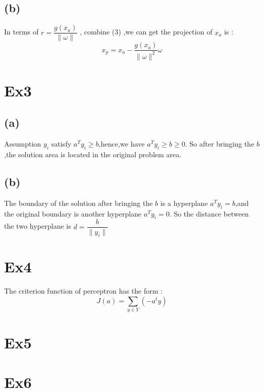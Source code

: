 \documentclass[10pt,a4paper]{article}
\begin{document}
	\subsection{(b)}
	In terms of $r=\dfrac{g(x_a)}{\|\omega\|}$ , combine (3) ,we can get the projection of $x_a$ is :
	\begin{equation*}
	x_p=x_a-\dfrac{g(x_a)}{\|\omega\|^2}\omega
	\end{equation*} 
\section{Ex3}
\subsection{(a)}
Assumption $y_i$ satisfy $a^Ty_i\geq b$,hence,we have $a^Ty_i\geq b\geq 0$.
So after bringing the $b$,the solution area is located in the original problem area.
\subsection{(b)}
The boundary of the solution after bringing the $b$ is a  hyperplane $a^Ty_i=b$,and the original boundary is another hyperplane $a^Ty_i=0$.
So the distance between the two hyperplane is $d=\dfrac{b}{\|y_i\|}$
\section{Ex4}

The criterion function of perceptron has the form :
\begin{equation*}
J(a)=\sum_{y\in Y}(-a^ty)
\end{equation*}
\section{Ex5}
\section{Ex6}
\end{document}

